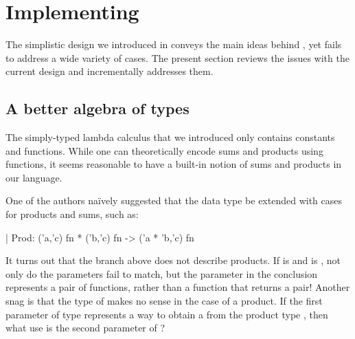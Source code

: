 
\section{Implementing \arti}
\label{sec:representation}

The simplistic design we introduced in  conveys the main ideas
behind \arti, yet fails to address a wide variety of cases. The present section
reviews the issues with the current design and incrementally addresses them.

\subsection{A better algebra of types}
\label{sec:algebra}

The simply-typed lambda calculus that we introduced only contains constants and
functions. While one can theoretically encode sums and products using functions,
it seems reasonable to have a built-in notion of sums and products in our
language.

One of the authors naïvely suggested that the data type be extended with cases
for products and sums, such as:
%
\begin{ocamlcode}
| Prod: ('a,'c) fn * ('b,'c) fn -> ('a * 'b,'c) fn
\end{ocamlcode}
%
It turns out that the branch above does not describe products. If  is
 and  is , not only do the
 parameters fail to match, but the  parameter in the
conclusion represents a pair of functions, rather than a function that returns a
pair! Another snag is that the type of  makes no sense in the case of
a product. If the first parameter of type  represents a way to
obtain a  from the product type , then what use is the second
parameter of ?

